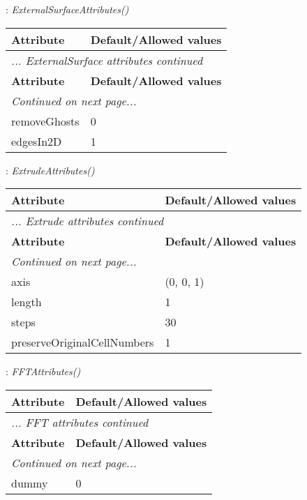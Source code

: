 \documentclass[10pt,a4paper]{report}
\begin{document}
\newpage

{}
: {\it ExternalSurfaceAttributes() }\\[-3mm]

\begin{longtable}{ll}
{\bf Attribute} & {\bf Default/Allowed values} \\
\hline \hline
\endfirsthead
\multicolumn{2}{l}{{\it ... ExternalSurface attributes continued}} \\
{\bf Attribute} & {\bf Default/Allowed values} \\
\hline \hline
\endhead
\hline
\multicolumn{2}{l}{{\it Continued on next page...}} \\
\endfoot
\hline
\endlastfoot

removeGhosts  &  0 \\
edgesIn2D  &  1 \\
\end{longtable}

\newpage

{}
: {\it ExtrudeAttributes() }\\[-3mm]

\begin{longtable}{ll}
{\bf Attribute} & {\bf Default/Allowed values} \\
\hline \hline
\endfirsthead
\multicolumn{2}{l}{{\it ... Extrude attributes continued}} \\
{\bf Attribute} & {\bf Default/Allowed values} \\
\hline \hline
\endhead
\hline
\multicolumn{2}{l}{{\it Continued on next page...}} \\
\endfoot
\hline
\endlastfoot

axis  &  (0, 0, 1) \\
length  &  1 \\
steps  &  30 \\
preserveOriginalCellNumbers  &  1 \\
\end{longtable}

\newpage

{}
: {\it FFTAttributes() }\\[-3mm]

\begin{longtable}{ll}
{\bf Attribute} & {\bf Default/Allowed values} \\
\hline \hline
\endfirsthead
\multicolumn{2}{l}{{\it ... FFT attributes continued}} \\
{\bf Attribute} & {\bf Default/Allowed values} \\
\hline \hline
\endhead
\hline
\multicolumn{2}{l}{{\it Continued on next page...}} \\
\endfoot
\hline
\endlastfoot

dummy  &  0 \\
\end{longtable}
\end{document}
